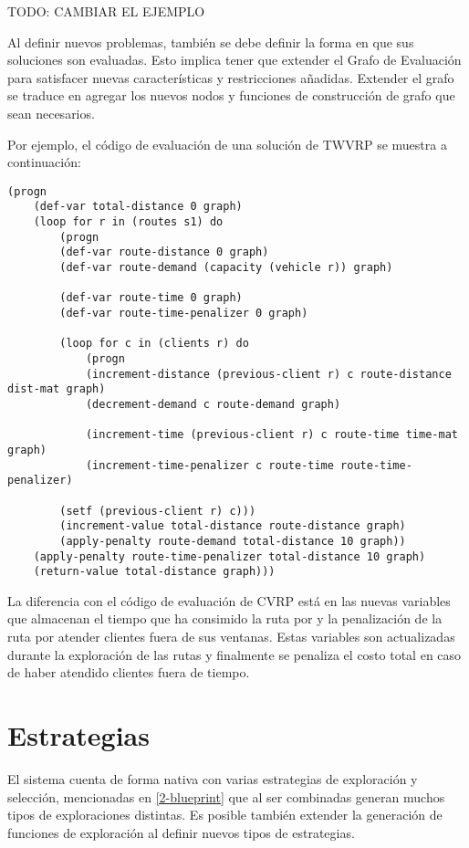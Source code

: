 TODO: CAMBIAR EL EJEMPLO

Al definir nuevos problemas, también se debe definir la forma en que sus soluciones son evaluadas. Esto implica tener que extender el Grafo de Evaluación para satisfacer nuevas características y restricciones añadidas. Extender el grafo se traduce en agregar los nuevos nodos y funciones de construcción de grafo que sean necesarios.

Por ejemplo, el código de evaluación de una solución de TWVRP se muestra a continuación:

\begin{lstlisting}
(progn
	(def-var total-distance 0 graph)
	(loop for r in (routes s1) do 
		(progn
		(def-var route-distance 0 graph)
		(def-var route-demand (capacity (vehicle r)) graph) 
		
		(def-var route-time 0 graph)
		(def-var route-time-penalizer 0 graph)
		
		(loop for c in (clients r) do 
			(progn
			(increment-distance (previous-client r) c route-distance dist-mat graph)
			(decrement-demand c route-demand graph) 
			
			(increment-time (previous-client r) c route-time time-mat graph)
			(increment-time-penalizer c route-time route-time-penalizer)
		
		(setf (previous-client r) c)))
		(increment-value total-distance route-distance graph)
		(apply-penalty route-demand total-distance 10 graph)) 
	(apply-penalty route-time-penalizer total-distance 10 graph)
	(return-value total-distance graph)))
\end{lstlisting}

La diferencia con el código de evaluación de CVRP está en las nuevas variables que almacenan el tiempo que ha consimido la ruta por y la penalización de la ruta por atender clientes fuera de sus ventanas. Estas variables son actualizadas durante la exploración de las rutas y finalmente se penaliza el costo total en caso de haber atendido clientes fuera de tiempo.


\section{Estrategias}
El sistema cuenta de forma nativa con varias estrategias de exploración y selección, mencionadas en \ref{2-blueprint} que al ser combinadas generan muchos tipos de exploraciones distintas. Es posible también extender la generación de funciones de exploración al definir nuevos tipos de estrategias.

